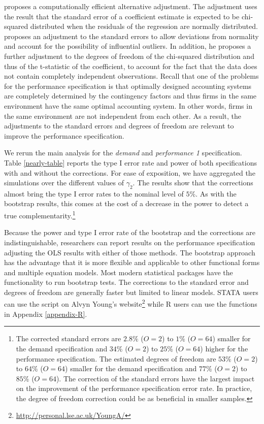 \documentclass[12pt]{article}
\begin{document}
\citet{young_improved_2016} proposes a computationally efficient alternative adjustment. The adjustment uses the result that the standard error of a coefficient estimate is expected to be chi-squared distributed when the residuals of the regression are normally distributed. \cite{young_improved_2016} proposes an adjustment to the standard errors to allow deviations from normality and account for the possibility of influential outliers. In addition, he proposes a further adjustment to the degrees of freedom of the chi-squared distribution and thus of the t-statistic of the coefficient, to account for the fact that the data does not contain completely independent observations. Recall that one of the problems for the performance specification is that optimally designed accounting systems are completely determined by the contingency factors and thus firms in the same environment have the same optimal accounting system. In other words, firms in the same environment are not independent from each other. As a result, the adjustments to the standard errors and degrees of freedom are relevant to improve the performance specification.

We rerun the main analysis for the \emph{demand} and \emph{performance 1} specification. Table \ref{nearly-table} reports the type I error rate and power of both specifications with and without the corrections. For ease of exposition, we have aggregated the simulations over the different values of $\gamma_2$. The results show that the corrections almost bring the type I error rates to the nominal level of $5\%$. As with the bootstrap results, this comes at the cost of a decrease in the power to detect a true complementarity.\footnote{The corrected standard errors are $2.8\%$ ($O = 2$) to $1\%$ ($O = 64$) smaller for the demand specification and $34\%$ ($O = 2$) to $25\%$ ($O = 64$) higher for the performance specification. The estimated degrees of freedom are $53\%$ ($O = 2$) to $64\%$ ($O = 64$) smaller for the demand specification and $77\%$ ($O = 2$) to $85\%$ ($O = 64$). The correction of the standard errors have the largest impact on the improvement of the performance specification error rate. In practice, the degree of freedom correction could be as beneficial in smaller samples.}



Because the power and type I error rate of the bootstrap and the \citet{young_improved_2016} corrections are indistinguishable, researchers can report results on the performance specification adjusting the OLS results with either of those methods. The bootstrap approach has the advantage that it is more flexible and applicable to other functional forms and multiple equation models. Most modern statistical packages have the functionality to run bootstrap tests. The corrections to the standard error and degrees of freedom are generally faster but limited to linear models. STATA users can use the script on Alvyn Young's website\footnote{\url{http://personal.lse.ac.uk/YoungA/}} while R users can use the functions in Appendix \ref{appendix-R}.
\end{document}
